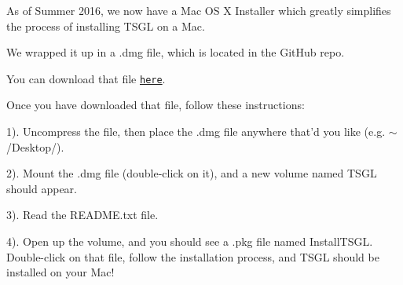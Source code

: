 As of Summer 2016, we now have a Mac O\-S X Installer which greatly simplifies the process of installing T\-S\-G\-L on a Mac.

We wrapped it up in a {\ttfamily .dmg} file, which is located in the Git\-Hub repo.

You can download that file \href{https://github.com/Calvin-CS/TSGL/blob/master/MacBinInstaller/TSGL.dmg}{\tt here}.

Once you have downloaded that file, follow these instructions\-:

1). Uncompress the file, then place the {\ttfamily .dmg} file anywhere that'd you like (e.\-g. {\ttfamily $\sim$/\-Desktop/}).

2). Mount the {\ttfamily .dmg} file (double-\/click on it), and a new volume named {\ttfamily T\-S\-G\-L} should appear.

3). Read the {\ttfamily R\-E\-A\-D\-M\-E.\-txt} file.

4). Open up the volume, and you should see a {\ttfamily .pkg} file named {\ttfamily Install\-T\-S\-G\-L}. Double-\/click on that file, follow the installation process, and T\-S\-G\-L should be installed on your Mac! 